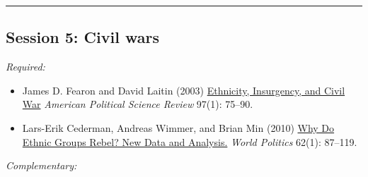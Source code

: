 \documentclass[12pt, a4paper]{article}
\begin{document}

\vspace{20pt}
\hrule
\subsection*{Session 5: Civil wars}

\noindent\textit{Required:}

\begin{itemize}
  \item James D. Fearon and David Laitin (2003) \href{https://doi.org/10.1017/S0003055403000534}{Ethnicity, Insurgency, and Civil War} \textit{American Political Science Review} 97(1): 75--90.
  \item Lars-Erik Cederman, Andreas Wimmer, and Brian Min (2010) \href{https://doi.org/10.1017/S0043887109990219}{Why Do Ethnic Groups Rebel? New Data and Analysis.} \textit{World Politics} 62(1): 87--119.
\end{itemize}

\vspace{10pt}

\noindent\textit{Complementary:}
\end{document}
